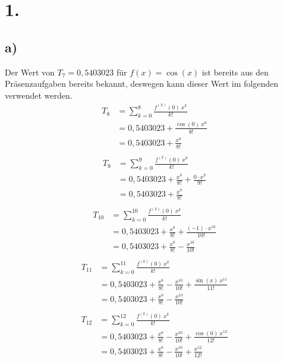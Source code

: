 \documentclass[a4paper]{scrartcl}
\title{\titleinfo}
\author{Elena Noll, Sven-Hendrik Haase, Arne Struck}
\date{\today}
\begin{document}
\maketitle
\notag


\section{1.}
\subsection{a)}
Der Wert von \(T_7=0,5403023\) für \(f(x)=\cos(x)\) ist bereits aus den Präsenzaufgaben bereits bekannt, deswegen kann dieser Wert im folgenden verwendet werden.
\begin{align}
T_8 &= \sum_{k=0}^8\frac{f^{(k)}(0)\ x^k}{k!}\\
  &=0,5403023+\frac{\cos(0)\ x^8}{8!}\\
	&=0,5403023+\frac{x^8}{8!}\\
\end{align}
\begin{align}
T_9 &=\sum_{k=0}^9\frac{f^{(k)}(0)\ x^k}{k!}\\
	&=0,5403023+\frac{x^8}{8!}+\frac{0\cdot x^9}{9!}\\
	&=0,5403023+\frac{x^8}{8!}\\
\end{align}
\begin{align}
T_{10}&=\sum_{k=0}^{10}\frac{f^{(k)}(0)\ x^k}{k!}\\
	&=0,5403023+\frac{x^8}{8!}+\frac{(-1)\cdot x^{10}}{10!}\\
	&=0,5403023+\frac{x^8}{8!}-\frac{x^{10}}{10!}\\
\end{align}
\begin{align}
T_{11}&=\sum_{k=0}^{11}\frac{f^{(k)}(0)\ x^k}{k!}\\
	&=0,5403023+\frac{x^8}{8!}-\frac{x^{10}}{10!}+\frac{\sin(x)\ x^{11}}{11!}\\
	&=0,5403023+\frac{x^8}{8!}-\frac{x^{10}}{10!}\\
\end{align}
\begin{align}
T_{12}&=\sum_{k=0}^{12}\frac{f^{(k)}(0)\ x^k}{k!}\\
	&=0,5403023+\frac{x^8}{8!}-\frac{x^{10}}{10!}+\frac{\cos(0)\ x^{12}}{12!}\\
	&=0,5403023+\frac{x^8}{8!}-\frac{x^{10}}{10!}+\frac{x^{12}}{12!}\\
\end{align}
\end{document}
